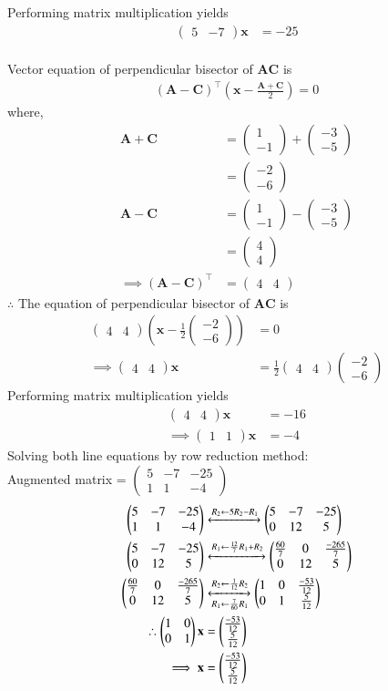 \documentclass[journal,12pt,twocolumn]{IEEEtran}
\theoremstyle{remark}
\newcommand{\myvec}[1]{\ensuremath{\begin{pmatrix}#1\end{pmatrix}}}
\let\vec\mathbf
\begin{document}
Performing matrix multiplication yields
\begin{align}
\myvec{5&-7}\vec{x}&=-25
\end{align}\\
Vector equation of perpendicular bisector of $\vec{AC}$ is
\begin{align}
(\vec{A}-\vec{C})^\top\left( \vec{x} - \frac{\vec{A}+\vec{C}}{2}\right) = 0
\end{align}
where,
\begin{align}
\vec{A}+\vec{C}&=\myvec{1\\-1}+\myvec{-3\\-5}\\
&=\myvec{-2\\-6}\\
\vec{A}-\vec{C} &= \myvec{1\\-1}-\myvec{-3\\-5}\\
&=\myvec{4\\4}\\
\implies (\vec{A}-\vec{C})^\top &= \myvec{4&4}
\end{align}
$\therefore $ The equation of perpendicular bisector of $\vec{AC}$ is
\begin{align}
\myvec{4&4}\left( \vec{x}-\frac{1}{2}\myvec{-2\\-6} \right)&=0\\
\implies \myvec{4&4}\vec{x}&=\frac{1}{2}\myvec{4&4}\myvec{-2\\-6}
\end{align}
Performing matrix multiplication yields
\begin{align}
\myvec{4&4}\vec{x}&=-16\\
\implies \myvec{1&1}\vec{x}&=-4
\end{align}
Solving both line equations by row reduction method:\\
Augmented matrix = $\myvec{5&-7&-25\\1&1&-4}$
\begin{align}
\myvec{5&-7&-25\\1&1&-4} &\xleftrightarrow[]{R_2 \leftarrow 5R_2 - R_1} \myvec{5&-7&-25\\0&12&5}\\
\myvec{5&-7&-25\\0&12&5} &\xleftrightarrow[]{R_1\leftarrow \frac{12}{7}R_1 + R_2} \myvec{\frac{60}{7}&0& \frac{-265}{7}\\0&12&5}\\
\myvec{\frac{60}{7}&0& \frac{-265}{7}\\0&12&5} &\xleftrightarrow[R_1\leftarrow \frac{7}{60}R_1]{R_2 \leftarrow \frac{1}{12}R_2} \myvec{1&0& \frac{-53}{12}\\0&1&\frac{5}{12}}\\
\therefore \myvec{1&0\\0&1}\vec{x} &= \myvec{\frac{-53}{12}\\\frac{5}{12}}\\
\implies \vec{x}&=\myvec{\frac{-53}{12}\\\frac{5}{12}}
\end{align}
\end{document}
